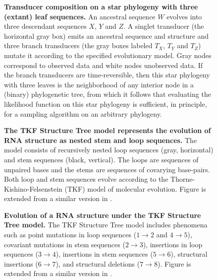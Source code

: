 \documentclass[10pt]{article}
\begin{document}
 \begin{figure}[!ht]
   \centering
   \caption{
     \textbf{Transducer composition on a star phylogeny with three
       (extant) leaf sequences.}
     An ancestral sequence $W$ evolves into three descendant sequences $X$, $Y$ and $Z$.
     A singlet transducer (the horizontal gray box) emits an ancestral sequence and structure
     and three branch transducers (the gray boxes labeled $T_X$, $T_Y$ and $T_Z$)
     mutate it according to the specified evolutionary model.
     Gray nodes correspond to observed data and white nodes unobserved data.
     If the branch transducers are time-reversible, then this star phylogeny with three leaves is
     the neighborhood of any interior node in a (binary) phylogenetic tree, 
     from which it follows that evaluating the likelihood function
     on this star phylogeny is sufficient, in principle, for a sampling algorithm on an arbitrary phylogeny.
   }
 \end{figure}
 
\begin{figure}[!ht]
  \centering
  \caption{
    \textbf{The TKF Structure Tree model represents the
      evolution of RNA structure as nested stem and loop sequences.}
    The model consists of recursively nested loop sequences (gray,
    horizontal) and stem sequences (black, vertical). The loops are
    sequences of unpaired bases and the stems are sequences of
    covarying base-pairs. Both loop and stem sequences evolve
    according to the Thorne-Kishino-Felsenstein (TKF) model
    \cite{ThorneEtal91} of molecular evolution.  Figure is extended
    from a similar version in \cite{Holmes2004}.
  }
\end{figure}

\begin{figure}[!ht]
  \centering
  \caption{
    \textbf{Evolution of a RNA structure under the TKF Structure Tree
      model.}
    The TKF Structure Tree model includes phenomena such as point
    mutations in loop sequences ($1 \rightarrow 2$ and $4 \rightarrow 5$), covariant
    mutations in stem sequences ($2 \rightarrow 3$), insertions in
    loop sequences ($3 \rightarrow 4$), insertions in stem sequences
    ($5 \rightarrow 6$), structural insertions ($6 \rightarrow 7$),
    and structural deletions ($7 \rightarrow 8$).
   Figure is extended from a similar version in \cite{Holmes2004}.
  }
\end{figure}
\end{document}
